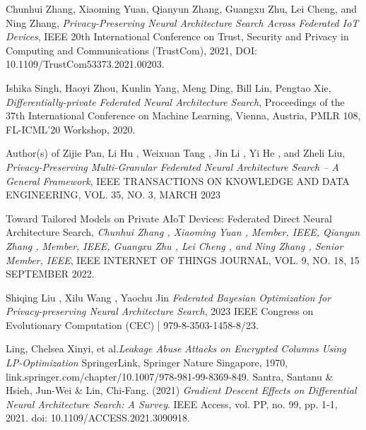 \documentclass[conference]{IEEEtran}
\begin{document}
\begin{thebibliography}{99}%

Chunhui Zhang, Xiaoming Yuan, Qianyun Zhang, Guangxu Zhu, Lei Cheng, and Ning Zhang,
\textit{Privacy-Preserving Neural Architecture Search Across Federated IoT Devices},
IEEE 20th International Conference on Trust, Security and Privacy in Computing and Communications (TrustCom), 2021, DOI: 10.1109/TrustCom53373.2021.00203.

Ishika Singh, Haoyi Zhou, Kunlin Yang, Meng Ding, Bill Lin, Pengtao Xie,
\textit{Differentially-private Federated Neural Architecture Search},
Proceedings of the 37th International Conference on Machine Learning, Vienna, Austria, PMLR 108, FL-ICML’20 Workshop, 2020.

Author(s) of Zijie Pan, Li Hu , Weixuan Tang , Jin Li , Yi He , and Zheli Liu,
\textit{Privacy-Preserving Multi-Granular Federated Neural Architecture Search – A General Framework},
IEEE TRANSACTIONS ON KNOWLEDGE AND DATA ENGINEERING, VOL. 35, NO. 3, MARCH 2023

Toward Tailored Models on Private AIoT Devices: Federated Direct Neural Architecture Search,
\textit{Chunhui Zhang , Xiaoming Yuan , Member, IEEE, Qianyun Zhang , Member, IEEE, Guangxu Zhu , Lei Cheng , and Ning Zhang , Senior Member, IEEE},
IEEE INTERNET OF THINGS JOURNAL, VOL. 9, NO. 18, 15 SEPTEMBER 2022.

Shiqing Liu , Xilu Wang , Yaochu Jin
\textit{Federated Bayesian Optimization for Privacy-preserving Neural Architecture Search},
2023 IEEE Congress on Evolutionary Computation (CEC) | 979-8-3503-1458-8/23.

Ling, Chelsea Xinyi, et al.\textit{Leakage Abuse Attacks on Encrypted Columns Using LP-Optimization} SpringerLink, Springer Nature Singapore, 1970, link.springer.com/chapter/10.1007/978-981-99-8369-849.
Santra, Santanu & Hsieh, Jun-Wei & Lin, Chi-Fang. (2021) \textit{Gradient Descent Effects on Differential Neural Architecture Search: A Survey}. IEEE Access, vol. PP, no. 99, pp. 1-1, 2021. doi: 10.1109/ACCESS.2021.3090918.
\end{thebibliography}
\end{document}
